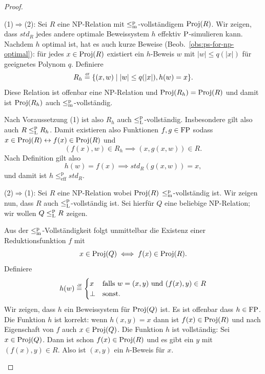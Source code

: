 \begin{proof}
    \begin{prooflist}
    \item (1)$\Rightarrow$(2): 
        Sei $R$ eine NP-Relation mit $\leqmp$-vollständigem $\Proj(R)$.
    Wir zeigen, dass $\mathit{std}_{R}$ jedes andere optimale Beweissystem $h$ effektiv $\P$-simulieren kann.
    Nachdem $h$ optimal ist, hat es auch kurze Beweise (Beob.~\ref{obs:ps-for-np-optimal}): für jedes $x\in\Proj(R)$ existiert ein $h$-Beweis $w$ mit $|w|\leq q(|x|)$ für geeignetes Polynom $q$.  Definiere
    \[ R_h \defeq \{ (x, w) \mid |w|\leq q(|x|), h(w) = x\}. \]
    Diese Relation ist offenbar eine NP-Relation und $\Proj(R_h) = \Proj(R)$ und damit ist $\Proj(R_h)$ auch $\leqmp$-vollständig. 

    Nach Voraussetzung (1) ist also  $R_h$ auch $\leqlp$-vollständig.
    Insbesondere gilt also  auch $R \leqlp R_h$. Damit existieren also Funktionen $f,g\in\FP$ sodass
    $x\in \Proj(R) \leftrightarrow f(x)\in\Proj(R)$ und
    \[ (f(x), w) \in R_h \implies (x, g(x, w))\in R. \]
    Nach Definition gilt also 
    \[ h(w)=f(x) \implies \mathit{std}_R(g(x, w)) = x, \]
    und damit ist $h\leq^\mathrm p_\mathrm{eff} \mathit{std}_R$.

\item (2)$\Rightarrow$(1): 
    Sei $R$ eine NP-Relation wobei $\Proj(R)$ $\leqmp$-vollständig ist. Wir zeigen nun, dass $R$ auch $\leqlp$-vollständig ist.
    Sei hierfür $Q$ eine beliebige NP-Relation; wir wollen $Q\leqlp R$ zeigen.

    Aus der $\leqmp$-Vollständigkeit folgt unmittelbar die Existenz einer Reduktionsfunktion $f$ mit 
    \[ x\in \Proj(Q) \iff f(x) \in \Proj(R). \]
    Definiere
    \[ h(w) \defeq \begin{cases} x & \text{falls $w=(x,y)$ und $(f(x),y)\in R$} \\ \bot & \text{sonst.} \end{cases} \]
    Wir zeigen, dass $h$ ein Beweissystem für $\Proj(Q)$ ist. Es ist offenbar dass $h\in\FP$. Die Funktion $h$ ist korrekt: wenn $h(x,y)=x$ dann ist $f(x)\in\Proj(R)$ und nach Eigenschaft von $f$ auch $x\in\Proj(Q)$.
    Die Funktion $h$ ist vollständig: Sei $x\in\Proj(Q)$. Dann ist schon $f(x)\in\Proj(R)$ und es gibt ein $y$ mit $(f(x),y)\in R$. Also ist $(x,y)$ ein $h$-Beweis für $x$.


\end{prooflist}
\end{proof}
